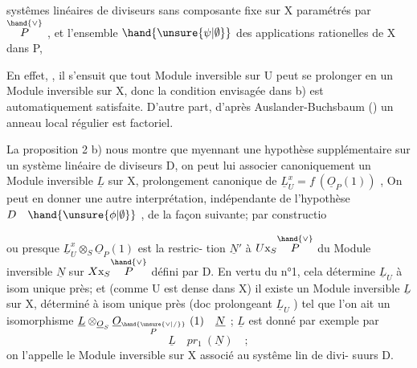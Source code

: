 
systêmes linéaires de diviseurs sans composante fixe  sur X paramétrés
par $\overset{\hand{\vee}}{P}$ , et l'ensemble $\hand{\unsure{\psi|\emptyset}}$  des applications rationelles de X dans P, 


En effet,   , il s'ensuit que tout Module inversible sur
U peut se prolonger en un Module inversible sur X, donc la condition
envisagée dans b) est automatiquement satisfaite. D'autre part, d'après
Auslander-Buchsbaum () un annea\hand{/}u local
régulier est factoriel.

\margin{\unsure{$\times\quad\times\quad\nearrow$}}La proposition 2  b)  nous montre que myennant une hypothèse
supplémentaire sur un système linéaire de diviseurs D, on peut
lui associer canoniquement un Module inversible $\underline{L}$ sur X, prolongement
canonique de $\underline{L}^{x}_{U} = f\ (\underline{O}_P(1))$ ,  On peut en donner une autre interprétation,
indépendante de l'hypothèse  $D\quad\hand{\unsure{\phi|\emptyset}}$ , de la façon suivante; par constructio

 ou presque $\underline{L}^{x}_{U}\otimes_S\underline{O}_P(1)$ est   la restric-%
tion $\underline{N}'$ à $U\mathrm{x}_S\overset{\hand{\vee}}{P}$  du  Module inversible $\underline{N}$  sur $X\mathrm{x}_S\overset{\hand{\vee}}{P}$  défini par D. En vertu
du  n°1, cela détermine  $\underline{L}_U$  à isom unique près;
et  (comme U est dense dans X)  il existe  un Module inversible $\underline{L}$ sur X,
déterminé à isom unique près (doc prolongeant $\underline{L}_U$ ) tel que  l'on ait
un isomorphisme  $\underline{L}\otimes_{\underline{O}_S}\underline{O}_{\overset{\hand{\unsure{\vee|/}}}{P}}\ (1) \quad \underline{N}$ ;  $\underline{L}$  est donné par exemple par
\[ \underline{L} \quad pr_1\ (\underline{N}) \quad ; \]
on l'appelle  le Module inversible sur X associé au systême lin de divi-%
suurs D.

